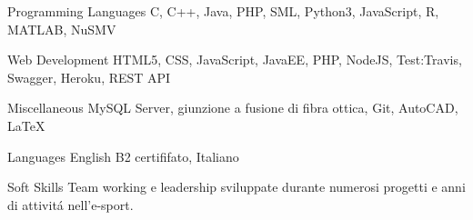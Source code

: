 

\begin{cvskills}

  \cvskill
    {Programming Languages} %
    {C, C++, Java, PHP, SML, Python3, JavaScript, R, MATLAB, NuSMV} %

  \cvskill
    {Web Development} %
    {HTML5, CSS, JavaScript, JavaEE, PHP, NodeJS, Test:Travis, Swagger, Heroku, REST API} %

  \cvskill
    {Miscellaneous} %
    {MySQL Server, giunzione a fusione di fibra ottica, Git, AutoCAD, LaTeX} %

  \cvskill
    {Languages} %
    {English B2 certififato, Italiano} %

  \cvskill
    {Soft Skills} %
    {Team working e leadership sviluppate durante numerosi progetti e anni di attivit\'a nell'e-sport.} %

\end{cvskills}
